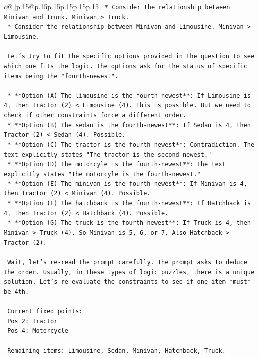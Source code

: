 \documentclass{article}
\begin{document}
{\begin{supertabular}{c@{$\;$}|p{.15\linewidth}@{}p{.15\linewidth}p{.15\linewidth}p{.15\linewidth}p{.15\linewidth}p{.15\linewidth}}
{{{\texttt{    *   Consider the relationship between Minivan and Truck. Minivan > Truck.} \\
\texttt{    *   Consider the relationship between Minivan and Limousine. Minivan > Limousine.} \\
\\ 
\texttt{    Let's try to fit the specific options provided in the question to see which one fits the logic. The options ask for the status of specific items being the "fourth{-}newest".} \\
\\ 
\texttt{    *   **Option (A) The limousine is the fourth{-}newest**: If Limousine is 4, then Tractor (2) < Limousine (4). This is possible. But we need to check if other constraints force a different order.} \\
\texttt{    *   **Option (B) The sedan is the fourth{-}newest**: If Sedan is 4, then Tractor (2) < Sedan (4). Possible.} \\
\texttt{    *   **Option (C) The tractor is the fourth{-}newest**: Contradiction. The text explicitly states "The tractor is the second{-}newest."} \\
\texttt{    *   **Option (D) The motorcyle is the fourth{-}newest**: The text explicitly states "The motorcyle is the fourth{-}newest."} \\
\texttt{    *   **Option (E) The minivan is the fourth{-}newest**: If Minivan is 4, then Tractor (2) < Minivan (4). Possible.} \\
\texttt{    *   **Option (F) The hatchback is the fourth{-}newest**: If Hatchback is 4, then Tractor (2) < Hatchback (4). Possible.} \\
\texttt{    *   **Option (G) The truck is the fourth{-}newest**: If Truck is 4, then Minivan > Truck (4). So Minivan is 5, 6, or 7. Also Hatchback > Tractor (2).} \\
\\ 
\texttt{    Wait, let's re{-}read the prompt carefully. The prompt asks to deduce the order. Usually, in these types of logic puzzles, there is a unique solution. Let's re{-}evaluate the constraints to see if one item *must* be 4th.} \\
\\ 
\texttt{    Current fixed points:} \\
\texttt{    Pos 2: Tractor} \\
\texttt{    Pos 4: Motorcycle} \\
\\ 
\texttt{    Remaining items: Limousine, Sedan, Minivan, Hatchback, Truck.} \\
}}}
\end{supertabular}}
\end{document}

